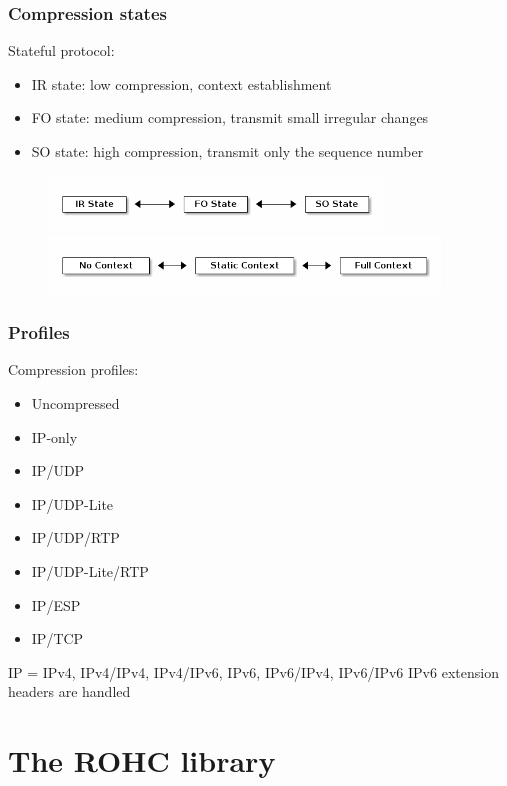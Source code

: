 \documentclass[utf8]{beamer}
\begin{document}
\begin{frame}
	\frametitle{Compression states}
	Stateful protocol:
	\begin{itemize}
		\item IR state: low compression, context establishment
		\item FO state: medium compression, transmit small irregular changes
		\item SO state: high compression, transmit only the sequence number
	\end{itemize}
	\begin{figure}
		\includegraphics[height=15mm]{images/rohc_comp_states.png} \\
		\includegraphics[height=15mm]{images/rohc_decomp_states.png}
	\end{figure}
\end{frame}
\begin{frame}
	\frametitle{Profiles}
	Compression profiles:
	\begin{itemize}
		\item Uncompressed
		\item IP-only
		\item IP/UDP
		\item IP/UDP-Lite
		\item IP/UDP/RTP
		\item IP/UDP-Lite/RTP
		\item IP/ESP
		\item IP/TCP
	\end{itemize}
	IP = IPv4, IPv4/IPv4, IPv4/IPv6, IPv6, IPv6/IPv4, IPv6/IPv6
	IPv6 extension headers are handled
\end{frame}




\section{The ROHC library}
\end{document}
